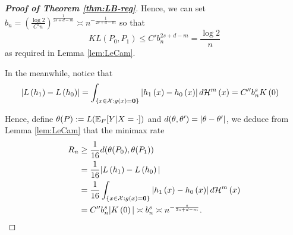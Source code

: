 \documentclass[12pt,american]{article}
\theoremstyle{definition}
\theoremstyle{plain}
\theoremstyle{definition}
\theoremstyle{plain}
\theoremstyle{plain}
\theoremstyle{plain}
\theoremstyle{plain}
\theoremstyle{plain}
\newcommand{\E}{\mathbb{E}}
\begin{document}
\begin{proof}[\textbf{Proof of Theorem \ref{thm:LB-reg}}]
Hence, we can set $b_{n} =  \left(\frac{\log 2}{C'n}\right)^{\frac{1}{2s+d-m}} \asymp n^{-\frac{1}{2s+d-m}}$ so that
\[
KL\left(P_{0},P_{1}\right) \leq C'b_{n}^{2s+d-m} = \frac{\log2}{n}
\]
as required in Lemma \ref{lem:LeCam}.

In the meanwhile, notice that
\begin{align*}
\left|L\left(h_{1}\right)-L\left(h_{0}\right)\right| & =\int_{\left\{x\in\mathcal{X}: g(x)=\textbf{0}\right\} }\left|h_{1}\left(x\right)-h_{0}\left(x\right)\right|d{\cal H}^{m}\left(x\right)
 =C''b_{n}^{s}K\left(0\right)
\end{align*}

Hence, define $\theta(P) := L(\E_P[Y|X=\cd])$ and $d(\theta,\theta') = |\theta-\theta'|$, we deduce from Lemma \ref{lem:LeCam} that the minimax rate
\begin{align*}
R_{n} & \geq \frac{1}{16}d(\theta(P_{0}),\theta(P_{1})) \\
& = \frac{1}{16}|L\left(h_{1}\right)-L\left(h_{0}\right)|\\
& =\frac{1}{16}\int_{\left\{x\in\mathcal{X}: g(x)=\textbf{0}\right\} }\left|h_{1}\left(x\right)-h_{0}\left(x\right)\right|d{\cal H}^{m}\left(x\right)\\
&=C''b_{n}^{s}|K\left(0\right)| \asymp b_{n}^{s} \asymp   n^{-\frac{s}{2s+d-m}}.
\end{align*}
\end{proof}

\end{document}
